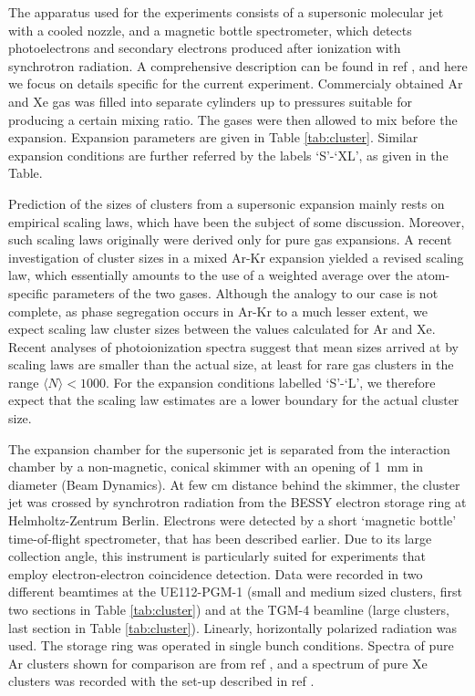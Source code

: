 \documentclass[journal=jpccck,manuscript=article]{achemso}
\begin{document}
%
%
The apparatus used for the experiments consists of a supersonic molecular jet with a cooled nozzle, and a magnetic bottle spectrometer, which detects photoelectrons and secondary electrons produced after ionization with synchrotron radiation.\cite{arion} 
A comprehensive description can be found in ref , and here we focus on details specific for the current experiment. 
Commercialy obtained Ar and Xe gas was filled into 
separate cylinders up to pressures suitable for producing a certain mixing ratio. The gases were then allowed to mix before the expansion. 
Expansion parameters are given in Table \ref{tab:cluster}. 
Similar expansion conditions are further referred by the labels `S'-`XL', as given in the Table.

Prediction of the sizes of clusters from a supersonic expansion mainly rests on empirical scaling laws,\cite{Hagena1992} which have been the subject of some discussion.
Moreover, such scaling laws originally were derived only for pure gas expansions.
A recent investigation of cluster sizes in a mixed Ar-Kr expansion yielded a revised scaling law, which essentially amounts to the use of a weighted average over the atom-specific parameters of the two gases.\cite{danylchenko2015} 
Although the analogy to our case is not complete, as phase segregation occurs in Ar-Kr to a much lesser extent,\cite{Vach_1999,lundwall_arkr} we expect scaling law cluster sizes between the values calculated for Ar and Xe.
Recent analyses of photoionization spectra suggest that mean sizes arrived at by scaling laws are smaller than the actual size, at least for rare gas clusters in the range $\langle N\rangle < 1000$.\cite{bergersen,hergenhahnprb,foerstel_arg2_2011}
For the expansion conditions labelled `S'-`L', we therefore expect that the scaling law estimates are a lower boundary for the actual cluster size.

The expansion chamber for the supersonic jet is separated from the interaction chamber by a non-magnetic, conical skimmer with an opening of 1~mm in diameter (Beam Dynamics). 
At few cm distance behind the skimmer, the cluster jet was crossed by synchrotron radiation from the BESSY electron storage ring at Helmholtz-Zentrum Berlin. 
Electrons were detected by a short `magnetic bottle' time-of-flight spectrometer, that has been described earlier.\cite{mucke_review}
Due to its large collection angle, this instrument is particularly suited for experiments that employ electron-electron coincidence detection.
Data were recorded in two different beamtimes at the UE112-PGM-1 (small and medium sized clusters, first two sections in Table \ref{tab:cluster}) and at the TGM-4 beamline (large clusters, last section in Table \ref{tab:cluster}). 
Linearly, horizontally polarized radiation was used. 
The storage ring was operated in single bunch conditions.
Spectra of pure Ar clusters shown for comparison are from ref , and a spectrum of pure Xe clusters was recorded with the set-up described in ref .
\end{document}
